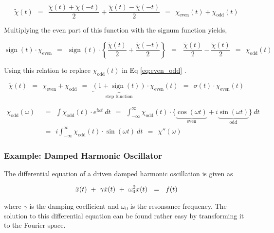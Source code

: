 \documentclass[10pt]{report}
\numberwithin{equation}{chapter}
\newcommand{\refEq}[1]{
  Eq  \ref{#1}
}
\DeclareMathOperator{\sign}{sign}
\begin{document}

\begin{equation} \label{eq:even_odd}
\tilde{\chi}(t) ~~ = ~~ \frac{\tilde{\chi}(t) + \tilde{\chi}(-t)}{2} + \frac{\tilde{\chi}(t) - \tilde{\chi}(-t)}{2} ~~ = ~~ \chi_\text{even}(t) + \chi_\text{odd}(t)
\end{equation}


Multiplying the even part of this function with the signum function yields,

\begin{equation}
  \sign(t) \cdot \chi_\text{even} ~~ = ~~ \sign(t) \cdot \left\{ \frac{\tilde{\chi}(t)}{2} + \frac{\tilde{\chi}(-t)}{2} \right\} ~~ = ~~~\frac{\tilde{\chi}(t)}{2} - \frac{\tilde{\chi}(t)}{2} ~~ = ~~ \chi_\text{odd}(t)
\end{equation}


Using this relation to replace $\chi_\text{odd}(t)$ in \refEq{eq:even_odd}.


\begin{equation}
\tilde{\chi}(t) ~~ = ~~ \chi_\text{even} + \chi_\text{odd} ~~ = ~~ \underbrace{(1 + \sign(t))}_\text{step function} \cdot \chi_\text{even}(t) ~~ = ~~ \sigma(t) \cdot \chi_\text{even}(t)
\end{equation}


\begin{align}
  \chi_\text{odd}(\omega) ~~& =~~ \int \chi_\text{odd}(t) \cdot e^{i\omega t}\ dt
  ~~=~~ \int_{-\infty}^\infty \chi_\text{odd}(t) \cdot
  \{ \underbrace{\cos(\omega t)}_\text{even} + i\underbrace{\sin(\omega t)}_\text{odd} \}\ dt \nonumber \\
  ~~& =~~ i \int_{-\infty}^{\infty} \chi_\text{odd}(t) \cdot \sin(\omega t)\ dt ~~=~~ \chi''(\omega)
\end{align}


\subsubsection{Example: Damped Harmonic Oscillator}

The differential equation of a driven damped harmonic oscillation is given as

\begin{equation} \label{eq:damped_osc_DE}
  \Ddot{x}(t) ~+~ \gamma \dot{x}(t) ~+~ \omega_0^2 x(t) ~~=~~ f(t)
\end{equation}

where $\gamma$ is the damping coefficient and $\omega_0$ is the resonsance frequency.
The solution to this differential equation can be found rather easy by transforming it to the Fourier space.
\end{document}
